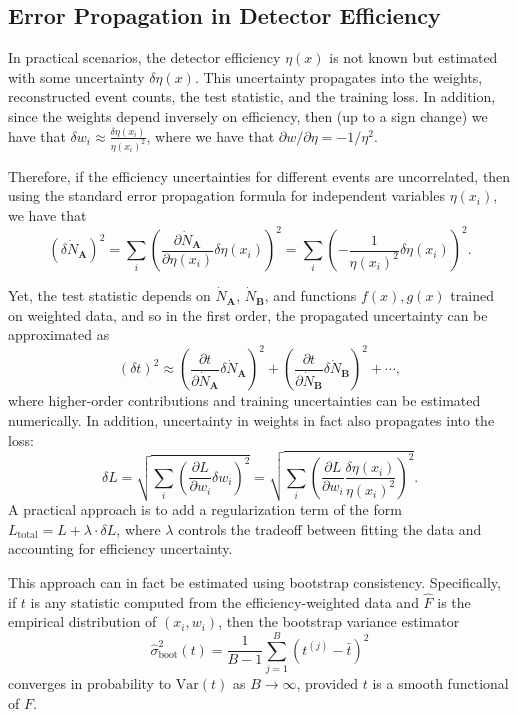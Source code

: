 \documentclass[../../ddppaper2.tex]{subfiles}
\begin{document}
\subsection{Error Propagation in Detector Efficiency}
In practical scenarios, the detector efficiency \( \eta(x) \) is not known but estimated with some uncertainty \( \delta \eta(x) \). This uncertainty propagates into the weights, reconstructed event counts, the test statistic, and the training loss. In addition, since the weights depend inversely on efficiency, then (up to a sign change) we have that $\delta w_i \approx \frac{\delta \eta(x_i)}{\eta(x_i)^2}$, where we have that \(\partial w / \partial \eta = -1/\eta^2\).

Therefore, if the efficiency uncertainties for different events are uncorrelated, then using the standard error propagation formula for independent variables \(\eta(x_i)\), we have that
\[
(\delta \dot{N}_{\mathbf{A}})^2 = \sum_i \left( \frac{\partial \dot{N}_{\mathbf{A}}}{\partial \eta(x_i)} \delta \eta(x_i) \right)^2 = \sum_i \left( -\frac{1}{\eta(x_i)^2} \delta \eta(x_i) \right)^2.
\]


Yet, the test statistic depends on \( \dot{N}_{\mathbf{A}} \), \( \dot{N}_{\mathbf{B}} \), and functions \( f(x), g(x) \) trained on weighted data, and so in the first order, the propagated uncertainty can be approximated as
\[
(\delta t)^2 \approx \left( \frac{\partial t}{\partial \dot{N}_{\mathbf{A}}} \delta \dot{N}_{\mathbf{A}} \right)^2 + \left( \frac{\partial t}{\partial \dot{N}_{\mathbf{B}}} \delta \dot{N}_{\mathbf{B}} \right)^2 + \cdots,
\]
where higher-order contributions and training uncertainties can be estimated numerically. In addition, uncertainty in weights in fact also propagates into the loss:
\[
\delta L = \sqrt{
\sum_{i} \left( \frac{\partial L}{\partial w_i} \delta w_i \right)^2
} = \sqrt{
\sum_{i} \left( \frac{\partial L}{\partial w_i} \frac{\delta \eta(x_i)}{\eta(x_i)^2} \right)^2
}.
\]
A practical approach is to add a regularization term of the form $L_{\mathrm{total}} = L + \lambda \cdot \delta L$, where \(\lambda\) controls the tradeoff between fitting the data and accounting for efficiency uncertainty.

This approach can in fact be estimated using bootstrap consistency. Specifically, if \(t\) is any statistic computed from the efficiency-weighted data and \(\hat{F}\) is the empirical distribution of \((x_i, w_i)\), then the bootstrap variance estimator
\[
\hat{\sigma}^2_{\mathrm{boot}}(t) = \frac{1}{B-1} \sum_{j=1}^B \left( t^{(j)} - \bar{t} \right)^2
\]
converges in probability to \(\mathrm{Var}(t)\) as \(B \to \infty\), provided \(t\) is a smooth functional of \(F\).
\end{document}
